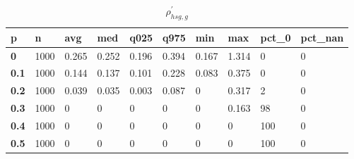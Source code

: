 \begin{table}[h]
 \centering 
\footnotesize
\caption{$\rho_{hsg,g}^\prime $}
\label{tab:alphahsgg}
\begin{tabular}[h]{|l|l|l|l|l|l|l|l|l|l|
    } \hline
\textbf{ p} & \textbf{ n} & \textbf{ avg} & \textbf{ med} & \textbf{ q025} & \textbf{ q975} & \textbf{ min} & \textbf{ max} & \textbf{ pct\_0} & \textbf{ pct\_nan}
    \\ \hline
  \textbf{  0} & 1000 & 0.265 & 0.252 & 0.196 & 0.394 & 0.167 & 1.314 &   0 & 0
    \\ \hline
  \textbf{0.1} & 1000 & 0.144 & 0.137 & 0.101 & 0.228 & 0.083 & 0.375 &   0 & 0
    \\ \hline
  \textbf{0.2} & 1000 & 0.039 & 0.035 & 0.003 & 0.087 &     0 & 0.317 &   2 & 0
    \\ \hline
  \textbf{0.3} & 1000 &     0 &     0 &     0 &     0 &     0 & 0.163 &  98 & 0
    \\ \hline
  \textbf{0.4} & 1000 &     0 &     0 &     0 &     0 &     0 &     0 & 100 & 0
    \\ \hline
  \textbf{0.5} & 1000 &     0 &     0 &     0 &     0 &     0 &     0 & 100 & 0
    \\ \hline
 \end{tabular}
 \end{table}
